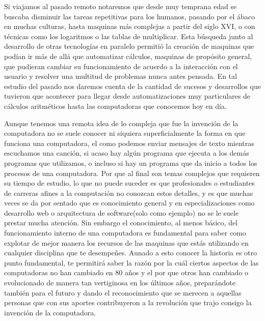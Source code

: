 \documentclass[letterpaper,12pt,oneside]{book}
\begin{document}
	Si viajamos al pasado remoto notaremos que desde muy temprana edad se buscaba disminuir las tareas repetitivas para los humanos, pasando por el ábaco
	en muchas culturas, hasta maquinas más complejas a partir del siglo XVI, o con técnicas como los logaritmos o las tablas de multiplicar. Esta búsqueda junto
	al desarrollo de otras tecnologías en paralelo permitió la creación de maquinas que podían ir más de allá que automatizar cálculos,
	maquinas de propósito general, que pudieran cambiar su funcionamiento de acuerdo a la interacción con el usuario y resolver
	una multitud de problemas nunca antes pensada\cite{ifrah_universal_2001}. En tal estudio del pasado nos daremos cuenta de la cantidad de sucesos y desarrollos que tuvieron 
	que acontecer para llegar desde automatizaciones muy particulares de cálculos aritméticos hasta las computadoras que conocemos hoy en día. 

	Aunque tenemos una remota idea de lo compleja que fue la invención de la computadora no se suele conocer ni siquiera superficialmente
	la forma en que funciona una computadora, el como podemos enviar mensajes de texto mientras escuchamos una canción, si acaso hay algún programa que ejecuta a los 
	demás programas que utilizamos, o incluso si hay un programa que da inicio a todos los procesos de una computadora. Por que al final son temas complejos
	que requieren su tiempo de estudio, lo que no puede suceder es que profesionales o estudiantes de carreras afines a la computación no conozcan estos detalles, y
	es que muchas veces se da por sentado que es conocimiento general y en especializaciones como desarrollo web o arquitectura de software(solo como ejemplo) no se le suele
	prestar mucha atención. Sin embargo el conocimiento, al menos básico, del funcionamiento interno de una computadora es fundamental para saber
	como explotar de mejor manera los recursos de las maquinas que estás utilizando en cualquier disciplina que te desempeñes. Aunado a esto conocer la historia
	es otro punto fundamental,
	te permitirá saber la razón por la cuál ciertos aspectos de las computadoras no han cambiado en 80 años y el por que otros han cambiado o evolucionado
	de manera tan vertiginosa en los últimos años, preparándote también para el futuro y dando el reconocimiento que se merecen a aquellas personas que
	con sus aportes contribuyeron a la revolución que trajo consigo la invención de la computadora.
	
\end{document}

